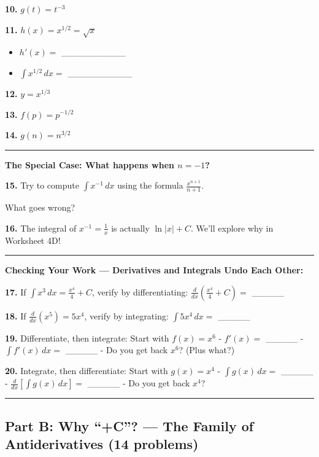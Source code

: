 \documentclass[
  11pt,
]{article}
\providecommand{\tightlist}{%
  \setlength{\itemsep}{0pt}\setlength{\parskip}{0pt}}
\begin{document}
\textbf{10.} \(g(t) = t^{-3}\)

\textbf{11.} \(h(x) = x^{1/2} = \sqrt{x}\)

\begin{itemize}
\tightlist
\item
  \(h'(x) ={}\) \_\_\_\_\_\_\_\_\_\_
\item
  \(\int x^{1/2} \, dx ={}\) \_\_\_\_\_\_\_\_\_\_
\end{itemize}

\textbf{12.} \(y = x^{1/3}\)

\textbf{13.} \(f(p) = p^{-1/2}\)

\textbf{14.} \(g(n) = n^{3/2}\)

\begin{center}\rule{0.5\linewidth}{0.5pt}\end{center}

\textbf{The Special Case: What happens when \(n = -1\)?}

\textbf{15.} Try to compute \(\int x^{-1} \, dx\) using the formula
\(\frac{x^{n+1}}{n+1}\).

What goes wrong?

\textbf{16.} The integral of \(x^{-1} = \frac{1}{x}\) is actually
\(\ln|x| + C\). We'll explore why in Worksheet 4D!

\begin{center}\rule{0.5\linewidth}{0.5pt}\end{center}

\textbf{Checking Your Work --- Derivatives and Integrals Undo Each
Other:}

\textbf{17.} If \(\int x^3 \, dx = \frac{x^4}{4} + C\), verify by
differentiating: \(\frac{d}{dx}\left(\frac{x^4}{4} + C\right) ={}\)
\_\_\_\_\_

\textbf{18.} If \(\frac{d}{dx}(x^5) = 5x^4\), verify by integrating:
\(\int 5x^4 \, dx ={}\) \_\_\_\_\_

\textbf{19.} Differentiate, then integrate: Start with \(f(x) = x^6\) -
\(f'(x) ={}\) \_\_\_\_\_ - \(\int f'(x) \, dx ={}\) \_\_\_\_\_ - Do you
get back \(x^6\)? (Plus what?)

\textbf{20.} Integrate, then differentiate: Start with \(g(x) = x^4\) -
\(\int g(x) \, dx ={}\) \_\_\_\_\_ -
\(\frac{d}{dx}\left[\int g(x) \, dx\right] ={}\) \_\_\_\_\_ - Do you get
back \(x^4\)?

\begin{center}\rule{0.5\linewidth}{0.5pt}\end{center}

\hypertarget{part-b-why-c-the-family-of-antiderivatives-14-problems}{%
\subsection{Part B: Why ``+C''? --- The Family of Antiderivatives (14
problems)}\label{part-b-why-c-the-family-of-antiderivatives-14-problems}}
\end{document}
